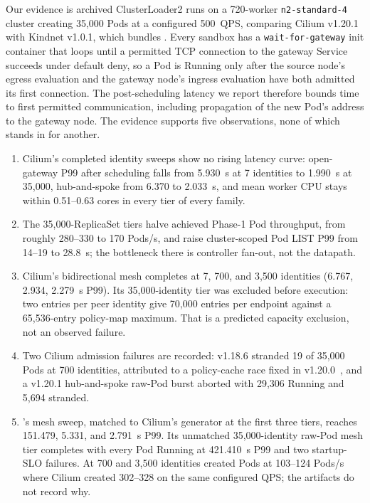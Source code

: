 Our evidence is archived ClusterLoader2 runs on a 720-worker
\texttt{n2-standard-4} cluster creating 35,000 Pods at a configured
500~QPS, comparing Cilium v1.20.1 with Kindnet v1.0.1, which bundles
\sys{}. Every sandbox has a \texttt{wait-for-gateway} init container that
loops until a permitted TCP connection to the gateway Service succeeds
under default deny, so a Pod is Running only after the source node's
egress evaluation and the gateway node's ingress evaluation have both
admitted its first connection. The post-scheduling latency we report
therefore bounds time to first permitted communication, including
propagation of the new Pod's address to the gateway node. The evidence
supports five observations, none of which stands in for another.
\begin{enumerate}
\setlength{\itemsep}{0pt}
\item Cilium's completed identity sweeps show no rising latency curve:
open-gateway P99 after scheduling falls from 5.930~s at 7 identities to
1.990~s at 35,000, hub-and-spoke from 6.370 to 2.033~s, and mean worker
CPU stays within 0.51--0.63 cores in every tier of every family.
\item The 35,000-ReplicaSet tiers halve achieved Phase-1 Pod throughput,
from roughly 280--330 to 170 Pods/s, and raise cluster-scoped Pod LIST P99
from 14--19 to 28.8~s; the bottleneck there is controller fan-out, not
the datapath.
\item Cilium's bidirectional mesh completes at 7, 700, and 3,500
identities (6.767, 2.934, 2.279~s P99). Its 35,000-identity tier was
excluded before execution: two entries per peer identity give 70,000
entries per endpoint against a 65,536-entry policy-map maximum. That is a
predicted capacity exclusion, not an observed failure.
\item Two Cilium admission failures are recorded: v1.18.6 stranded 19 of
35,000 Pods at 700 identities, attributed to a policy-cache race fixed in
v1.20.0~\cite{cilium7515}, and a v1.20.1 hub-and-spoke raw-Pod burst
aborted with 29,306 Running and 5,694 stranded.
\item \sys{}'s mesh sweep, matched to Cilium's generator at the first
three tiers, reaches 151.479, 5.331, and 2.791~s P99. Its unmatched
35,000-identity raw-Pod mesh tier completes with every Pod Running at
421.410~s P99 and two startup-SLO failures. At 700 and 3,500 identities
\sys{} created Pods at 103--124 Pods/s where Cilium created 302--328 on
the same configured QPS; the artifacts do not record why.
\end{enumerate}

